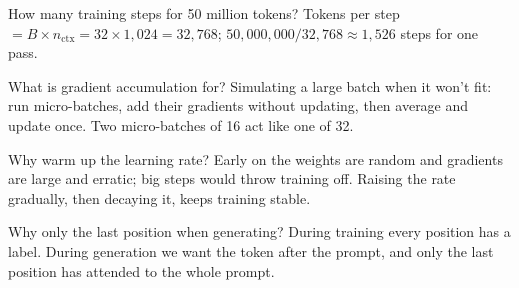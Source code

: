 \begin{iq}{How many training steps for 50 million tokens?}
Tokens per step $= B \times n_{\text{ctx}} = 32 \times 1{,}024 = 32{,}768$; $50{,}000{,}000 / 32{,}768 \approx 1{,}526$ steps for one pass.
\end{iq}

\begin{iq}{What is gradient accumulation for?}
Simulating a large batch when it won't fit: run micro-batches, add their gradients without updating, then average and update once. Two micro-batches of 16 act like one of 32.
\end{iq}

\begin{iq}{Why warm up the learning rate?}
Early on the weights are random and gradients are large and erratic; big steps would throw training off. Raising the rate gradually, then decaying it, keeps training stable.
\end{iq}

\begin{iq}{Why only the last position when generating?}
During training every position has a label. During generation we want the token after the prompt, and only the last position has attended to the whole prompt.
\end{iq}
